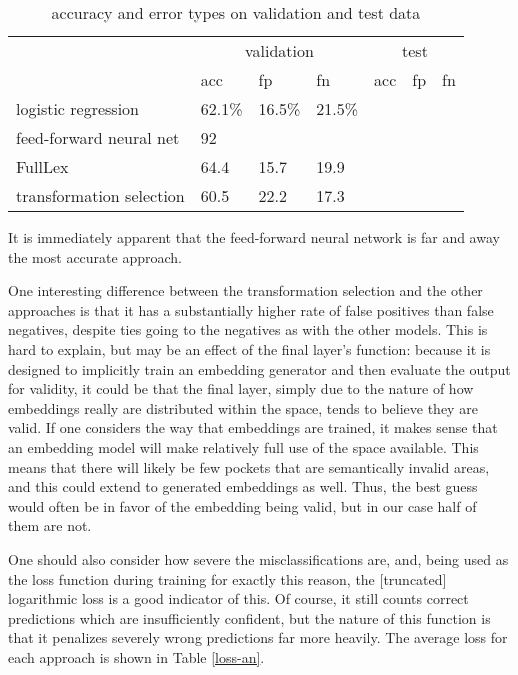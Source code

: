 \documentclass[a4paper, 11pt]{scrartcl}
\begin{document}
\begin{table}[]
	\centering
	\begin{tabular}{l|lll|lll}
		                         & \multicolumn{3}{c|}{validation} & \multicolumn{3}{c}{test} \\
		                         & acc      & fp       & fn        & acc     & fp     & fn    \\ \hline
		logistic regression      & 62.1\%   & 16.5\%   & 21.5\%    &         &        &       \\
		feed-forward neural net  & 92       &          &           &         &        &       \\
		FullLex                  & 64.4     & 15.7     & 19.9      &         &        &       \\
		transformation selection & 60.5     & 22.2     & 17.3      &         &        &      
	\end{tabular}
	\caption{accuracy and error types on validation and test data}
	\label{accuracy-an}
\end{table}

It is immediately apparent that the feed-forward neural network is far and away the most accurate approach.

One interesting difference between the transformation selection and the other approaches is that it has a substantially higher rate of false positives than false negatives, despite ties going to the negatives as with the other models. This is hard to explain, but may be an effect of the final layer's function: because it is designed to implicitly train an embedding generator and then evaluate the output for validity, it could be that the final layer, simply due to the nature of how embeddings really are distributed within the space, tends to believe they are valid. If one considers the way that embeddings are trained, it makes sense that an embedding model will make relatively full use of the space available. This means that there will likely be few pockets that are semantically invalid areas, and this could extend to generated embeddings as well. Thus, the best guess would often be in favor of the embedding being valid, but in our case half of them are not.

One should also consider how severe the misclassifications are, and, being used as the loss function during training for exactly this reason, the [truncated] logarithmic loss is a good indicator of this. Of course, it still counts correct predictions which are insufficiently confident, but the nature of this function is that it penalizes severely wrong predictions far more heavily. The average loss for each approach is shown in Table \ref{loss-an}.
\end{document}
